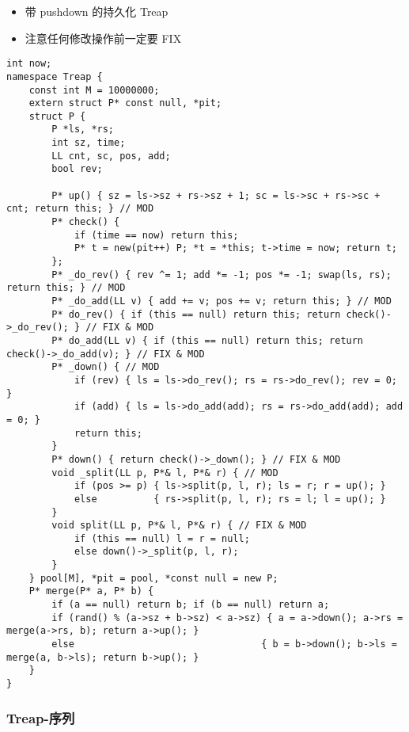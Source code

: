 \documentclass[]{article}
\providecommand{\tightlist}{%
  \setlength{\itemsep}{0pt}\setlength{\parskip}{0pt}}
\begin{document}
\begin{itemize}
\tightlist
\item
  带 pushdown 的持久化 Treap
\item
  注意任何修改操作前一定要 FIX
\end{itemize}

\begin{verbatim}
int now;
namespace Treap {
    const int M = 10000000;
    extern struct P* const null, *pit;
    struct P {
        P *ls, *rs;
        int sz, time;
        LL cnt, sc, pos, add;
        bool rev;

        P* up() { sz = ls->sz + rs->sz + 1; sc = ls->sc + rs->sc + cnt; return this; } // MOD
        P* check() {
            if (time == now) return this;
            P* t = new(pit++) P; *t = *this; t->time = now; return t;
        };
        P* _do_rev() { rev ^= 1; add *= -1; pos *= -1; swap(ls, rs); return this; } // MOD
        P* _do_add(LL v) { add += v; pos += v; return this; } // MOD
        P* do_rev() { if (this == null) return this; return check()->_do_rev(); } // FIX & MOD
        P* do_add(LL v) { if (this == null) return this; return check()->_do_add(v); } // FIX & MOD
        P* _down() { // MOD
            if (rev) { ls = ls->do_rev(); rs = rs->do_rev(); rev = 0; }
            if (add) { ls = ls->do_add(add); rs = rs->do_add(add); add = 0; }
            return this;
        }
        P* down() { return check()->_down(); } // FIX & MOD
        void _split(LL p, P*& l, P*& r) { // MOD
            if (pos >= p) { ls->split(p, l, r); ls = r; r = up(); }
            else          { rs->split(p, l, r); rs = l; l = up(); }
        }
        void split(LL p, P*& l, P*& r) { // FIX & MOD
            if (this == null) l = r = null;
            else down()->_split(p, l, r);
        }
    } pool[M], *pit = pool, *const null = new P;
    P* merge(P* a, P* b) {
        if (a == null) return b; if (b == null) return a;
        if (rand() % (a->sz + b->sz) < a->sz) { a = a->down(); a->rs = merge(a->rs, b); return a->up(); }
        else                                 { b = b->down(); b->ls = merge(a, b->ls); return b->up(); }
    }
}
\end{verbatim}

\hypertarget{treap-ux5e8fux5217}{%
\subsubsection{Treap-序列}\label{treap-ux5e8fux5217}}
\end{document}
